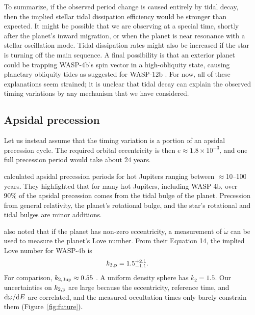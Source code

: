 \documentclass[12pt,twocolumn,tighten]{aastex62}
\begin{document}
To summarize, if the observed period change is caused entirely by
tidal decay, then the implied stellar tidal dissipation efficiency
would be stronger than expected.  It might be possible that we are
observing at a special time, shortly after the planet's inward
migration, or when the planet is near resonance with a stellar
oscillation mode.  Tidal dissipation rates might also be increased if
the star is turning off the main sequence.  A final possibility is
that an exterior planet could be trapping WASP-4b's spin vector in a
high-obliquity state, causing planetary obliquity tides as suggested
for WASP-12b \citep{millholland_obliquity_2018}.  For now, all of
these explanations seem strained; it is unclear that tidal decay can
explain the observed timing variations by any mechanism that we have
considered.


\subsection{Apsidal precession}
\label{sec:apsidal_precession}

Let us instead assume that the timing variation is a portion of an
apsidal precession cycle.  The required orbital eccentricity is then
$e\approx 1.8\times10^{-3}$, and one full precession period would take
about 24 years.

\citet{ragozzine_probing_2009} calculated apsidal precession periods
for hot Jupiters ranging between $\approx$10--100 years.  They
highlighted that for many hot Jupiters, including WASP-4b, over 90\%
of the apsidal precession comes from the tidal bulge of the planet.
Precession from general relativity, the planet's rotational bulge, and
the star's rotational and tidal bulges are minor additions.

\citet{ragozzine_probing_2009} also noted that if the planet has
non-zero eccentricity, a measurement of $\dot{\omega}$ can be used to
measure the planet's Love number.  From their Equation 14, the implied
Love number for WASP-4b is
\begin{equation}
k_{2,{\rm p}} = 1.5^{+2.1}_{-1.1}.
\end{equation}
For comparison, $k_{2,{\rm Jup}} \approx 0.55$
\citep{wahl_tidal_2016,ni_empirical_2018}.  A uniform density sphere
has $k_2 = 1.5$.  Our uncertainties on $k_{2,{\rm p}}$ are large
because the eccentricity, reference time, and ${\rm d}\omega/{\rm d}E$
are correlated, and the measured occultation times only barely
constrain them (Figure~\ref{fig:future}).
\end{document}
